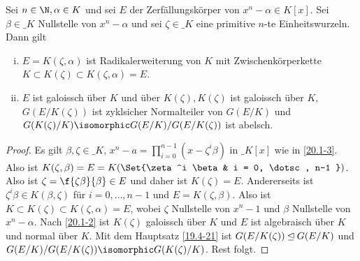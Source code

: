 \begin{kor} \label{20.2-4}
	Sei $n \in \N, \alpha \in K$ und sei $E$ der Zerfällungskörper von $x^n - \alpha \in K[x]$.
	Sei $\beta \in \_K$ Nullstelle von $x^n - \alpha$ und sei $\zeta \in \_K$ eine primitive $n$-te Einheitswurzeln.
	Dann gilt
	\begin{enumerate}[i)]
		\item
			$E = K(\zeta, \alpha)$ ist Radikalerweiterung von $K$ mit Zwischenkörperkette $K \subset K(\zeta) \subset K(\zeta, \alpha) = E$.
		\item
			$E$ ist galoissch über $K$ und über $K(\zeta), K(\zeta)$ ist galoissch über $K$, $G(E / K(\zeta))$ ist zyklsicher Normalteiler von $G(E / K)$ und $G(K(\zeta) / K) \isomorphic G(E / K) / \allowbreak G(E / K(\zeta))$ ist abelsch.
	\end{enumerate}
	\begin{proof}
		Es gilt $\beta, \zeta \in \_K$, $x^n - a = \prod_{i=0}^{n-1} (x - \zeta^i \beta)$ in $\_K[x]$ wie in \ref{20.1-3}.
		Also ist $K(\zeta, \beta) = E = K(\Set{\zeta^i \beta & i = 0, \dotsc, n-1 })$.
		Also ist $\zeta = \f {\zeta \beta}{\beta} \in E$ und daher ist $K(\zeta) = E$.
		Andererseits ist $\zeta^i \beta \in K(\beta, \zeta)$ für $i = 0, \dotsc, n-1$ und $E = K(\zeta, \beta)$.
		Also ist $K \subset K(\zeta) \subset K(\zeta, \alpha) = E$, wobei $\zeta$ Nullstelle von $x^n - 1$ und $\beta$ Nullstelle von $x^n  - \alpha$.
		Nach \ref{20.1-2} ist $K(\zeta)$ galoissch über $K$ und $E$ ist algebraisch über $K$ und normal über $K$.
		Mit dem Hauptsatz \ref{19.4-21} ist $G(E / K(\zeta)) \mathbin{\trianglelefteq} G(E / K)$ und $G(E / K) / G(E / K(\zeta)) \isomorphic G(K(\zeta) / K)$.
		Rest folgt.
	\end{proof}
\end{kor}

